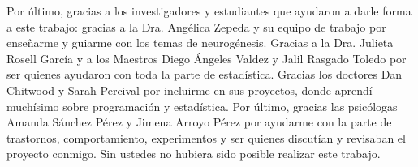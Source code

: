 
Por último, gracias a los investigadores y estudiantes que ayudaron a darle forma a este trabajo: gracias a la Dra. Angélica Zepeda y su equipo de trabajo por enseñarme y guiarme con los temas de neurogénesis. Gracias a la Dra. Julieta Rosell García y a los Maestros Diego Ángeles Valdez y Jalil Rasgado Toledo por ser quienes ayudaron con toda la parte de estadística. Gracias los doctores Dan Chitwood y Sarah Percival por incluirme en sus proyectos, donde aprendí muchísimo sobre programación y estadística. Por último, gracias las psicólogas Amanda Sánchez Pérez y Jimena Arroyo Pérez por ayudarme con la parte de trastornos, comportamiento, experimentos y ser quienes discutían y revisaban el proyecto conmigo. Sin ustedes no hubiera sido posible realizar este trabajo.